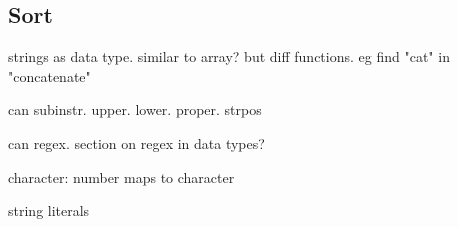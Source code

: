 
\subsection{Sort}

strings as data type. similar to array? but diff functions. eg find "cat" in "concatenate"

can subinstr. upper. lower. proper. strpos

can regex. section on regex in data types?

character: number maps to character


string literals